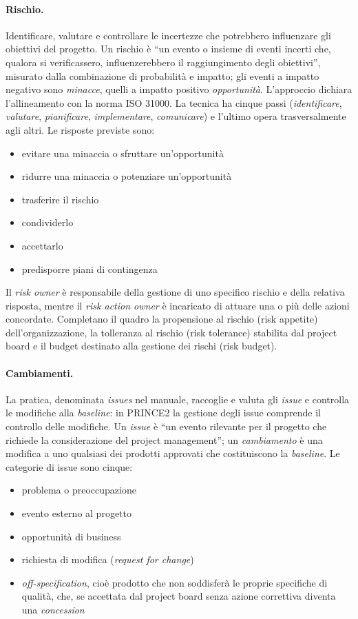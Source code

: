 \paragraph{Rischio.} Identificare, valutare e controllare le incertezze che
potrebbero influenzare gli obiettivi del progetto. Un rischio \`e ``un evento o
insieme di eventi incerti che, qualora si verificassero, influenzerebbero il
raggiungimento degli obiettivi'', misurato dalla combinazione di probabilit\`a e
impatto; gli eventi a impatto negativo sono \emph{minacce}, quelli a impatto
positivo \emph{opportunit\`a}. L'approccio dichiara l'allineamento con la norma
ISO 31000. La tecnica ha cinque passi (\emph{identificare}, \emph{valutare},
\emph{pianificare}, \emph{implementare}, \emph{comunicare}) e l'ultimo opera
trasversalmente agli altri. Le risposte previste sono:
\begin {itemize}
\item evitare una minaccia o sfruttare un'opportunit\`a
\item ridurre una minaccia o potenziare un'opportunit\`a
\item trasferire il rischio
\item condividerlo
\item accettarlo
\item predisporre piani di contingenza
\end {itemize}
Il \emph{risk owner} \`e responsabile della gestione di uno specifico rischio e
della relativa risposta, mentre il \emph{risk action owner} \`e incaricato di attuare
una o pi\`u delle azioni concordate.
Completano il quadro la propensione al rischio (risk appetite) dell'organizzazione,
la tolleranza al rischio (risk tolerance) stabilita dal project board e il budget
destinato alla gestione dei rischi (risk budget).

\paragraph{Cambiamenti.} La pratica, denominata \emph{issues} nel manuale,
raccoglie e valuta gli \emph{issue} e controlla le modifiche alla
\emph{baseline}: in PRINCE2 la gestione degli issue comprende il controllo delle
modifiche. Un \emph{issue} \`e ``un evento rilevante per il progetto che
richiede la considerazione del project management''; un \emph{cambiamento} \`e
una modifica a uno qualsiasi dei prodotti approvati che costituiscono la
\emph{baseline}. Le categorie di issue sono cinque:
\begin {itemize}
\item problema o preoccupazione
\item evento esterno al progetto
\item opportunit\`a di business
\item richiesta di modifica (\emph{request for change})
\item \emph{off-specification}, cio\`e prodotto che non soddisfer\`a le proprie
specifiche di qualit\`a, che, se accettata dal project board senza azione correttiva
diventa una \emph{concession}
\end {itemize}

